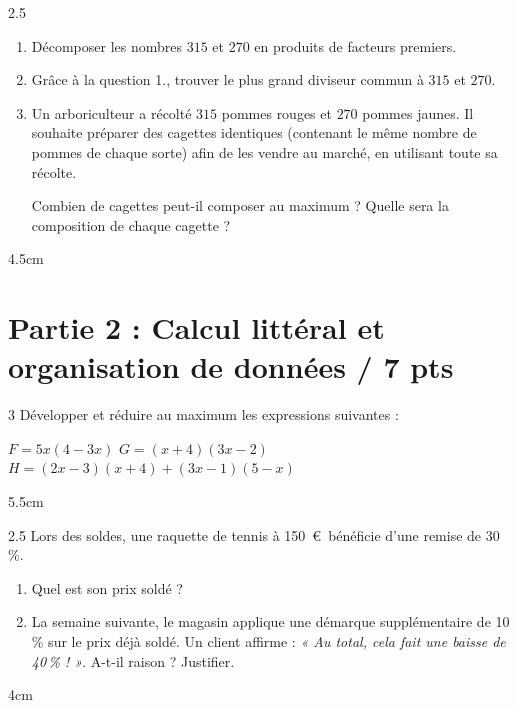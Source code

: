 \documentclass[a4paper]{book}
\begin{document}
{    
    \begin{exerciceNote}{2.5}
        \begin{enumerate}
            \item Décomposer les nombres $315$ et $270$ en produits de facteurs premiers.
            \item Grâce à la question 1., trouver le plus grand diviseur commun à $315$ et $270$.
            \item Un arboriculteur a récolté $315$ pommes rouges et $270$ pommes jaunes. Il souhaite préparer des cagettes identiques (contenant le même nombre de pommes de chaque sorte) afin de les vendre au marché, en utilisant toute sa récolte.
            
            Combien de cagettes peut-il composer au maximum ? Quelle sera la composition de chaque cagette ?
        \end{enumerate}
        
        \begin{ZoneReponse}{4.5cm}
        \end{ZoneReponse}
    \end{exerciceNote}
    
    
\section*{Partie 2 : Calcul littéral et organisation de données \points[2]/ 7 pts }

    \begin{exerciceNote}{3}
        Développer et réduire au maximum les expressions suivantes :
        \medskip
        
        $F = 5x(4 - 3x)$ \quad $G = (x + 4)(3x - 2)$ \quad $H = (2x - 3)(x + 4) + (3x - 1)(5 - x)$
        
        \begin{ZoneReponse}{5.5cm}
        \end{ZoneReponse}
    \end{exerciceNote}
    
    
    \begin{exerciceNote}{2.5}
        Lors des soldes, une raquette de tennis à 150~\euro~bénéficie d'une remise de 30\,\%. 
        \begin{enumerate}
            \item Quel est son prix soldé ?
            \item La semaine suivante, le magasin applique une démarque supplémentaire de 10\,\% sur le prix déjà soldé. Un client affirme : \textit{« Au total, cela fait une baisse de 40\,\% ! »}. A-t-il raison ? Justifier.
        \end{enumerate}
        \begin{ZoneReponse}{4cm}
        \end{ZoneReponse}
    \end{exerciceNote}


}
\end{document}
